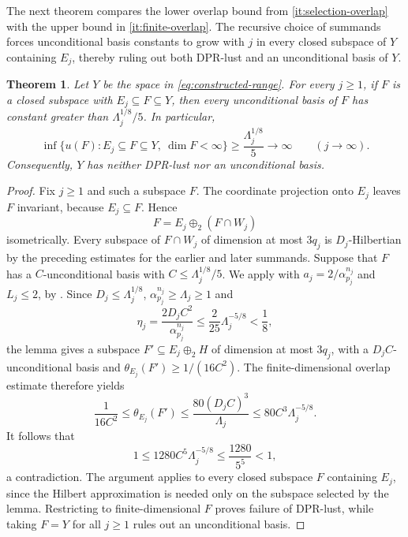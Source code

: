 \documentclass[11pt,a4paper,reqno]{amsart}
\newtheorem{theorem}{Theorem}[section]
\theoremstyle{definition}
\numberwithin{equation}{section}
\begin{document}
The next theorem compares the lower overlap bound from \ref{it:selection-overlap} with the upper bound in \ref{it:finite-overlap}. The recursive choice of summands forces unconditional basis constants to grow with $j$ in every closed subspace of $Y$ containing $E_j$, thereby ruling out both DPR-lust and an unconditional basis of $Y$.

\begin{theorem}\label{thm:no-unconditional}\label{thm:separated}
Let $Y$ be the space in \eqref{eq:constructed-range}. For every $j\geq1$, if $F$ is a closed subspace with $E_j\subseteq F\subseteq Y$, then every unconditional basis of $F$ has constant greater than $\Lambda_j^{1/8}/5$. In particular,
\begin{equation*}
 \inf\{u(F): E_j\subseteq F\subseteq Y,\ \dim F<\infty\}
 \geq \frac{\Lambda_j^{1/8}}5
 \longrightarrow\infty\qquad(j\to\infty).
\end{equation*}
Consequently, $Y$ has neither DPR-lust nor an unconditional basis.
\end{theorem}

\begin{proof}
Fix $j\geq1$ and such a subspace $F$. The coordinate projection onto $E_j$ leaves $F$ invariant, because $E_j\subseteq F$. Hence
\begin{equation*}
 F=E_j\oplus_2(F\cap W_j)
\end{equation*}
isometrically. Every subspace of $F\cap W_j$ of dimension at most $3q_j$ is $D_j$-Hilbertian by the preceding estimates for the earlier and later summands. Suppose that $F$ has a $C$-unconditional basis with $C\leq\Lambda_j^{1/8}/5$. We apply  with $a_j=2/\alpha_{p_j}^{n_j}$ and $L_j\leq2$, by . Since $D_j\leq\Lambda_j^{1/8}$, $\alpha_{p_j}^{n_j}\geq\Lambda_j\geq1$ and
\begin{equation*}
 \eta_j=\frac{2D_jC^2}{\alpha_{p_j}^{n_j}}
 \leq\frac{2}{25}\Lambda_j^{-5/8}<\frac18,
\end{equation*}
the lemma gives a subspace $F'\subseteq E_j\oplus_2H$ of dimension at most $3q_j$, with a $D_jC$-unconditional basis and $\theta_{E_j}(F')\geq1/(16C^2)$. The finite-dimensional overlap estimate therefore yields
\begin{equation*}
 \frac1{16C^2}
 \leq\theta_{E_j}(F')
 \leq\frac{80(D_jC)^3}{\Lambda_j}
 \leq80C^3\Lambda_j^{-5/8}.
\end{equation*}
It follows that
\begin{equation*}
 1\leq1280C^5\Lambda_j^{-5/8}
 \leq\frac{1280}{5^5}<1,
\end{equation*}
a contradiction. The argument applies to every closed subspace $F$ containing $E_j$, since the Hilbert approximation is needed only on the subspace selected by the lemma. Restricting to finite-dimensional $F$ proves failure of DPR-lust, while taking $F=Y$ for all $j\geq1$ rules out an unconditional basis.
\end{proof}
\end{document}
